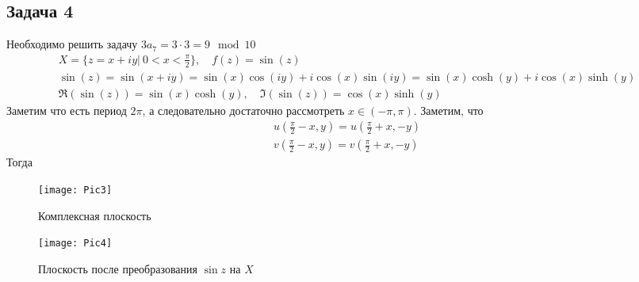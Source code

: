 \vskip 0.4in
\subsection*{Задача 4}
	Необходимо решить задачу $3a_7 = 3 \cdot 3 = 9 \mod 10$
	\begin{gather*}
		X = \{z = x + iy|\ 0<x<\frac{\pi}{2}\},\quad f(z) = \sin(z)\\
		\sin(z)
		= \sin(x + iy)
		= \sin(x)\cos(iy) + i\cos(x)\sin(iy)
		= \sin(x)\cosh(y) + i\cos(x)\sinh(y)\\
		\Re(\sin(z)) = \sin(x)\cosh(y),\quad \Im(\sin(z)) = \cos(x)\sinh(y)
	\end{gather*}
	Заметим что есть период $2\pi$, а следовательно достаточно рассмотреть $x \in (-\pi, \pi)$. Заметим, что
	\begin{gather*}
		u \left(\frac{\pi}{2} - x, y \right) = u\left( \frac{\pi}{2}+x, -y \right)\\
		v \left(\frac{\pi}{2}-x, y \right) = v \left( \frac{\pi}{2}+x, -y\right)
	\end{gather*}
	Тогда
	\begin{figure}[h]
	\begin{minipage}[h]{0.5\linewidth}
		\texttt{[image: Pic3]}
		\caption{Комплексная плоскость}
	\end{minipage}
	\hfill
	\begin{minipage}[h]{0.5\linewidth}
		\texttt{[image: Pic4]}
		\caption{Плоскость после преобразования $\sin z$ на $X$}
	\end{minipage}
	\end{figure}
\vskip 0.4in

\begin{comment}
\subsection*{Задача 5}
	Необходимо решить задачу $a_1 + a_8 = 7 + 8 = 5 \mod 10$
\end{comment}